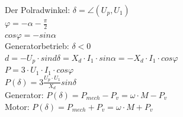 \begin{minipage}{0.5 \linewidth}
Der Polradwinkel: $\delta = \angle(U_p, U_1)$ \\

$\varphi = -\alpha - \frac{\pi}{2}$\\
$cos\varphi = -sin\alpha$\\

Generatorbetrieb: $\delta < 0$ \\

$d = -U_p \cdot sind\delta = X_d\cdot I_1 \cdot sin\alpha = -X_d\cdot I_1\cdot cos\varphi$ \\

$P = 3 \cdot U_1 \cdot I_1 \cdot cos\varphi$\\

$P(\delta) = 3 \frac{U_p\cdot U_1}{X_d} sin\delta$\\

Generator: $P(\delta) = P_{mech} - P_v = \omega \cdot M - P_v$ \\

Motor: $P(\delta) = P_{mech} + P_v = \omega \cdot M + P_v$ \\
\end{minipage}

